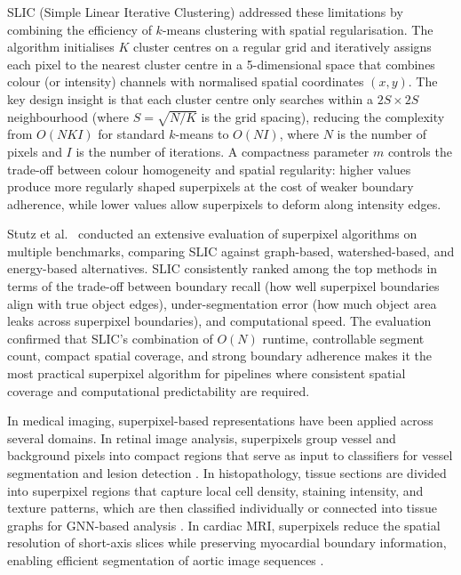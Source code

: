 \documentclass{article}
\begin{document}
SLIC (Simple Linear Iterative Clustering) \cite{achanta2012slic} addressed
these limitations by combining the efficiency of $k$-means clustering with
spatial regularisation. The algorithm initialises $K$ cluster centres on a
regular grid and iteratively assigns each pixel to the nearest cluster centre
in a 5-dimensional space that combines colour (or intensity) channels with
normalised spatial coordinates $(x, y)$. The key design insight is that each
cluster centre only searches within a $2S \times 2S$ neighbourhood (where
$S = \sqrt{N/K}$ is the grid spacing), reducing the complexity from $O(NKI)$
for standard $k$-means to $O(NI)$, where $N$ is the number of pixels and $I$
is the number of iterations. A compactness parameter $m$ controls the trade-off
between colour homogeneity and spatial regularity: higher values produce more
regularly shaped superpixels at the cost of weaker boundary adherence, while
lower values allow superpixels to deform along intensity edges.

Stutz et al.\ \cite{stutz2018superpixels} conducted an extensive evaluation of
superpixel algorithms on multiple benchmarks, comparing SLIC against
graph-based, watershed-based, and energy-based alternatives. SLIC consistently
ranked among the top methods in terms of the trade-off between boundary recall
(how well superpixel boundaries align with true object edges), under-segmentation
error (how much object area leaks across superpixel boundaries), and
computational speed. The evaluation confirmed that SLIC's combination of
$O(N)$ runtime, controllable segment count, compact spatial coverage, and
strong boundary adherence makes it the most practical superpixel algorithm for
pipelines where consistent spatial coverage and computational predictability
are required.

In medical imaging, superpixel-based representations have been applied across
several domains. In retinal image analysis, superpixels group vessel and
background pixels into compact regions that serve as input to classifiers for
vessel segmentation and lesion detection \cite{orlando2017retinal}. In
histopathology, tissue sections are divided into superpixel regions that
capture local cell density, staining intensity, and texture patterns, which
are then classified individually or connected into tissue graphs for GNN-based
analysis \cite{jha2021instance}. In cardiac MRI, superpixels reduce the
spatial resolution of short-axis slices while preserving myocardial boundary
information, enabling efficient segmentation of aortic image sequences
\cite{bai2018aortic}.
\end{document}
